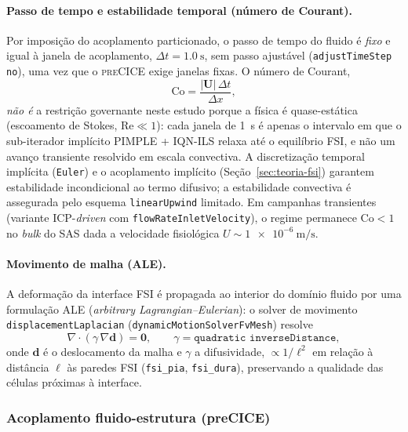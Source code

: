 \paragraph{Passo de tempo e estabilidade temporal (número de Courant).} Por
imposição do acoplamento particionado, o passo de tempo do fluido é \emph{fixo}
e igual à janela de acoplamento, $\Delta t = \SI{1.0}{\second}$, sem passo
ajustável (\texttt{adjustTimeStep no}), uma vez que o \textsc{preCICE} exige
janelas fixas. O número de Courant,
\begin{equation}
  \mathrm{Co} = \frac{|\mathbf{U}|\,\Delta t}{\Delta x},
  \label{eq:courant}
\end{equation}
\emph{não é} a restrição governante neste estudo porque a física é
quase-estática (escoamento de Stokes, $\mathrm{Re} \ll 1$): cada janela de
\SI{1}{\second} é apenas o intervalo em que o sub-iterador implícito PIMPLE +
IQN-ILS relaxa até o equilíbrio FSI, e não um avanço transiente resolvido em
escala convectiva. A discretização temporal implícita (\texttt{Euler}) e o
acoplamento implícito (Seção~\ref{sec:teoria-fsi}) garantem estabilidade
incondicional ao termo difusivo; a estabilidade convectiva é assegurada pelo
esquema \texttt{linearUpwind} limitado. Em campanhas transientes (variante
ICP-\emph{driven} com \texttt{flowRateInletVelocity}), o regime permanece
$\mathrm{Co} < 1$ no \emph{bulk} do SAS dada a velocidade fisiológica
$U \sim \SI{1e-6}{\meter\per\second}$.

\paragraph{Movimento de malha (ALE).} A deformação da interface FSI é propagada
ao interior do domínio fluido por uma formulação ALE
(\emph{arbitrary Lagrangian--Eulerian}): o solver de movimento
\texttt{displacementLaplacian} (\texttt{dynamicMotionSolverFvMesh}) resolve
\begin{equation}
  \nabla\!\cdot(\gamma\,\nabla\mathbf{d}) = \mathbf{0},
  \qquad
  \gamma = \texttt{quadratic inverseDistance},
  \label{eq:meshmotion}
\end{equation}
onde $\mathbf{d}$ é o deslocamento da malha e $\gamma$ a difusividade,
$\propto 1/\ell^2$ em relação à distância $\ell$ às paredes FSI
(\texttt{fsi\_pia}, \texttt{fsi\_dura}), preservando a qualidade das células
próximas à interface.

\subsubsection*{Acoplamento fluido-estrutura (preCICE)}
\label{sec:teoria-fsi}

